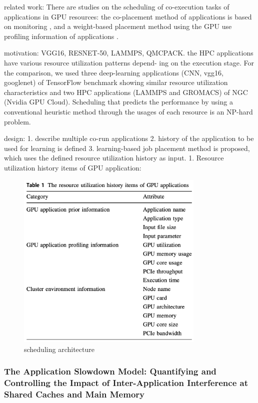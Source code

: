 \documentclass[UTF8]{article}
\begin{document}
related work: There are studies on the scheduling of co-execution tasks of applications in GPU resources: the co-placement method of applications is based on monitoring \cite{chang2017kubernetes,gu2018gaiagpu}, and a weight-based placement method using the GPU use profiling information of applications \cite{hong2017fairgv}.  

motivation:  VGG16, RESNET-50, LAMMPS, QMCPACK. the HPC applications have various resource utilization patterns depend- ing on the execution stage. For the comparison, we used three deep-learning applications (CNN, vgg16, googlenet) of TensorFlow benchmark showing similar resource utilization characteristics and two HPC applications (LAMMPS and GROMACS) of NGC (Nvidia GPU Cloud). Scheduling that predicts the performance by using a conventional heuristic method through the usages of each resource is an NP-hard problem. 

design: 1. describe multiple co-run applications 2. history of the application to be used for learning is defined 3. learning-based job placement method is proposed, which uses the defined resource utilization history as input.   1. Resource utilization history items of GPU application: 

\begin{figure}[htbp]
\caption{scheduling architecture}
\centering
\includegraphics[width=0.8\textwidth]{GPUAPP.png}
\end{figure}
 
\subsubsection{The Application Slowdown Model: Quantifying and Controlling the Impact of Inter-Application Interference at Shared Caches and Main Memory}
\end{document}
